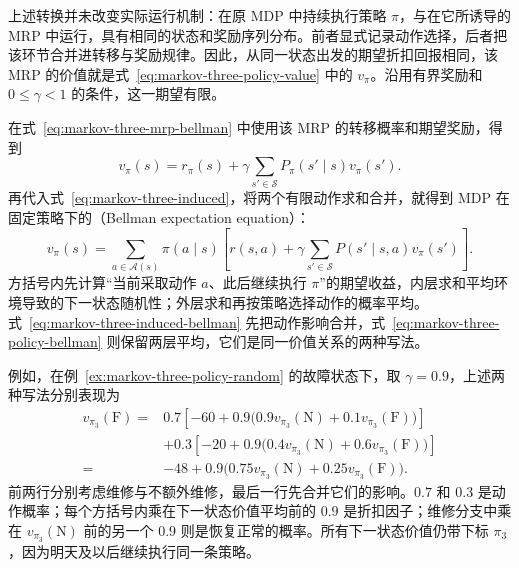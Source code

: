 \documentclass[UTF8]{ctexart}
\begin{document}
上述转换并未改变实际运行机制：在原 MDP 中持续执行策略 $\pi$，与在它所诱导的 MRP 中运行，具有相同的状态和奖励序列分布。前者显式记录动作选择，后者把该环节合并进转移与奖励规律。因此，从同一状态出发的期望折扣回报相同，该 MRP 的价值就是式~\eqref{eq:markov-three-policy-value} 中的 $v_\pi$。沿用有界奖励和 $0\leq\gamma<1$ 的条件，这一期望有限。

在式~\eqref{eq:markov-three-mrp-bellman} 中使用该 MRP 的转移概率和期望奖励，得到
\begin{equation}
  v_\pi(s)=r_\pi(s)+\gamma\sum_{s'\in\mathcal S}P_\pi(s'\mid s)v_\pi(s').
  \label{eq:markov-three-induced-bellman}
\end{equation}
再代入式~\eqref{eq:markov-three-induced}，将两个有限动作求和合并，就得到 MDP 在固定策略下的（Bellman expectation equation）：
\begin{equation}
  v_\pi(s)=\sum_{a\in\mathcal A(s)}\pi(a\mid s)
  \left[r(s,a)+\gamma\sum_{s'\in\mathcal S}P(s'\mid s,a)v_\pi(s')\right].
  \label{eq:markov-three-policy-bellman}
\end{equation}
方括号内先计算“当前采取动作 $a$、此后继续执行 $\pi$”的期望收益，内层求和平均环境导致的下一状态随机性；外层求和再按策略选择动作的概率平均。式~\eqref{eq:markov-three-induced-bellman} 先把动作影响合并，式~\eqref{eq:markov-three-policy-bellman} 则保留两层平均，它们是同一价值关系的两种写法。

例如，在例~\ref{ex:markov-three-policy-random} 的故障状态下，取 $\gamma=0.9$，上述两种写法分别表现为
\begin{equation}
  \begin{aligned}
    v_{\pi_3}(\mathrm F)
      ={}&0.7\left[-60+0.9\bigl(0.9v_{\pi_3}(\mathrm N)+0.1v_{\pi_3}(\mathrm F)\bigr)\right]\\
         &+0.3\left[-20+0.9\bigl(0.4v_{\pi_3}(\mathrm N)+0.6v_{\pi_3}(\mathrm F)\bigr)\right]\\
      ={}&-48+0.9\bigl(0.75v_{\pi_3}(\mathrm N)+0.25v_{\pi_3}(\mathrm F)\bigr).
  \end{aligned}
  \label{eq:markov-three-random-bellman}
\end{equation}
前两行分别考虑维修与不额外维修，最后一行先合并它们的影响。$0.7$ 和 $0.3$ 是动作概率；每个方括号内乘在下一状态价值平均前的 $0.9$ 是折扣因子；维修分支中乘在 $v_{\pi_3}(\mathrm N)$ 前的另一个 $0.9$ 则是恢复正常的概率。所有下一状态价值仍带下标 $\pi_3$，因为明天及以后继续执行同一条策略。
\end{document}
